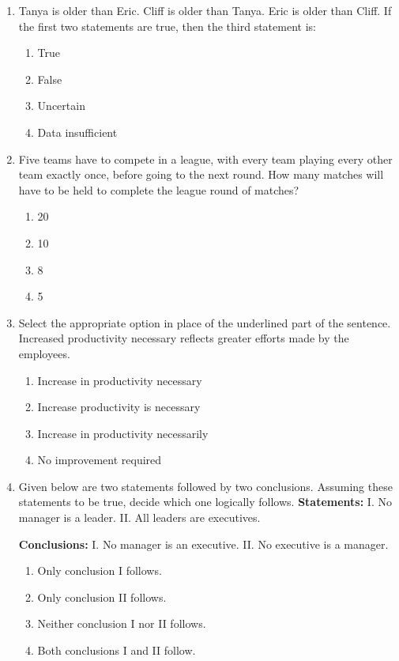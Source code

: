\documentclass[journal,12pt,onecolumn]{IEEEtran}
\theoremstyle{remark}
\begin{document}
\begin{enumerate}
\item Tanya is older than Eric. Cliff is older than Tanya. Eric is older than Cliff.  
If the first two statements are true, then the third statement is:  
\begin{enumerate}
\item True  
\item False  
\item Uncertain  
\item Data insufficient  
\end{enumerate}

\item Five teams have to compete in a league, with every team playing every other team exactly once, before going to the next round.  
How many matches will have to be held to complete the league round of matches?  
\begin{multicols}{4}
\begin{enumerate}
\item 20  
\item 10  
\item 8  
\item 5  
\end{enumerate}
\end{multicols}

\item Select the appropriate option in place of the underlined part of the sentence.  
Increased productivity necessary reflects greater efforts made by the employees.  
\begin{enumerate}
\item Increase in productivity necessary  
\item Increase productivity is necessary  
\item Increase in productivity necessarily  
\item No improvement required  
\end{enumerate}

\item Given below are two statements followed by two conclusions. Assuming these statements to be true, decide which one logically follows.  
\textbf{Statements:}  
I. No manager is a leader.  
II. All leaders are executives.  

\textbf{Conclusions:}  
I. No manager is an executive.  
II. No executive is a manager.  
\begin{enumerate}
\item Only conclusion I follows.  
\item Only conclusion II follows.  
\item Neither conclusion I nor II follows.  
\item Both conclusions I and II follow.  
\end{enumerate}


\end{enumerate}
\end{document}
